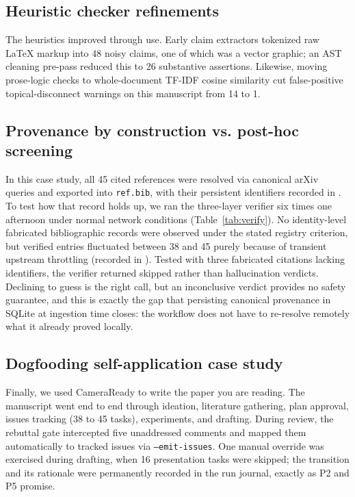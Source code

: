 \documentclass[conference]{IEEEtran}
\begin{document}
\subsection{Heuristic checker refinements}
The heuristics improved through use. Early claim extractors tokenized raw LaTeX markup into 48 noisy claims, one of which was a vector graphic; an AST cleaning pre-pass reduced this to 26 substantive assertions. Likewise, moving prose-logic checks to whole-document TF-IDF cosine similarity cut false-positive topical-disconnect warnings on this manuscript from 14 to 1.

\subsection{Provenance by construction vs. post-hoc screening}
In this case study, all 45 cited references were resolved via canonical arXiv queries and exported into \texttt{ref.bib}, with their persistent identifiers recorded in . To test how that record holds up, we ran the three-layer verifier six times one afternoon under normal network conditions (Table~\ref{tab:verify}). No identity-level fabricated bibliographic records were observed under the stated registry criterion, but verified entries fluctuated between 38 and 45 purely because of transient upstream throttling (recorded in ). Tested with three fabricated citations lacking identifiers, the verifier returned skipped rather than hallucination verdicts. Declining to guess is the right call, but an inconclusive verdict provides no safety guarantee, and this is exactly the gap that persisting canonical provenance in SQLite at ingestion time closes: the workflow does not have to re-resolve remotely what it already proved locally.

\subsection{Dogfooding self-application case study}
Finally, we used CameraReady to write the paper you are reading. The manuscript went end to end through ideation, literature gathering, plan approval, issues tracking (38 to 45 tasks), experiments, and drafting. During review, the rebuttal gate intercepted five unaddressed comments and mapped them automatically to tracked issues via \texttt{--emit-issues}. One manual override was exercised during drafting, when 16 presentation tasks were skipped; the transition and its rationale were permanently recorded in the run journal, exactly as P2 and P5 promise.
\end{document}
